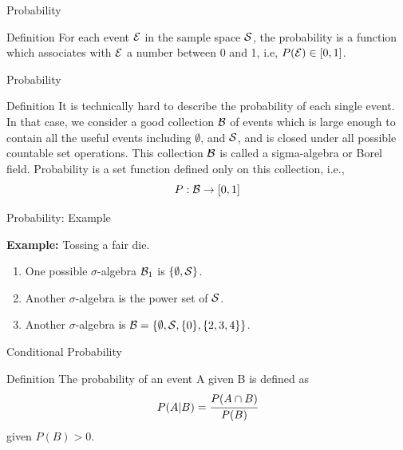 \documentclass[aspectratio=169,xcolor=dvipsnames,svgnames,x11names,fleqn]{beamer}
\begin{document}
    \begin{frame}[containsverbatim]{Probability}
    \begin{tblock}{Definition}
       For each event ${\mathcal E}$ in the sample space ${\mathcal S}$, the probability is a function which associates with ${\mathcal E}$ a number between 0 and 1, i.e, $P({\mathcal E}) \in [ 0, 1]$.
    \end{tblock}
    \end{frame}
    
    
    \begin{frame}[containsverbatim]{Probability}
        \begin{tblock}{Definition}
        It is technically hard to describe the probability of each single event. In that case, we consider a good collection ${\mathcal B}$ of events which is large enough to contain all the useful events including $\emptyset$, and ${\mathcal S}$, and is closed under all possible countable set operations. This collection ${\mathcal B}$ is called a sigma-algebra or Borel field. Probability is a set function defined only on this collection, i.e.,
        $$
        P: {\mathcal B} \rightarrow [0, 1]
        $$
        
        \end{tblock}
    \end{frame}

    \begin{frame}{Probability: Example}

        \textbf{Example:} Tossing a fair die.
    
       \begin{enumerate}
           \item One possible $\sigma$-algebra ${\mathcal B}_1$ is $\{ \emptyset, {\mathcal S}\}$.
           \item Another $\sigma$-algebra is the power set of ${\mathcal S}$.
           \item Another $\sigma$-algebra is ${\mathcal B} = \{\emptyset, {\mathcal S}, \{0\}, \{2, 3, 4\}\}$.
       \end{enumerate}
        
    \end{frame}
    
    
    \begin{frame}[containsverbatim]{Conditional Probability}
        \begin{tblock}{Definition}
            The probability of an event A given B is defined as
            \begin{equation}
                P(A|B) = \cfrac{P(A \cap B )}{P(B)}
            \end{equation}
            given $P(B) > 0$.
        \end{tblock}
    \end{frame}
\end{document}
